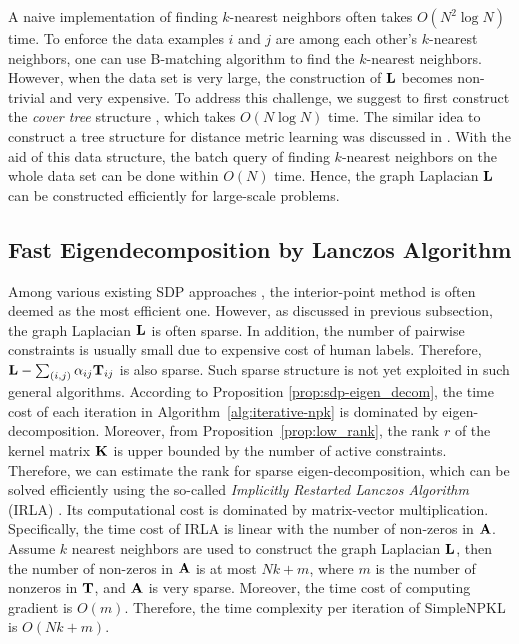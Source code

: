 A naive implementation of finding $k$-nearest neighbors often takes $O(N^2\log N)$
time. To enforce the data examples $i$ and $j$ are
among each other's $k$-nearest neighbors, one can use B-matching algorithm \cite{ecml/JebaraS06} to find the $k$-nearest neighbors. However, when the data set is very large, the construction of ${\bf L}$ becomes non-trivial and very expensive. To address this challenge, we suggest to first construct the {\em cover tree} structure \cite{icml/BeygelzimerKL06}, which takes $O(N\log N)$ time. The similar idea to construct a tree structure for distance metric learning was discussed in \cite{icml/weinberger08}. With the aid of this data structure, the batch query of finding $k$-nearest neighbors on the whole data set can be done within $O(N)$ time. Hence, the graph Laplacian ${\bf L}$ can be constructed efficiently for large-scale problems.

\subsection{Fast Eigendecomposition by Lanczos Algorithm} \label{sec:lanczos}

Among various existing SDP approaches \cite{Boyd}, the interior-point method is often deemed as the most efficient one. However, as discussed in previous subsection, the graph Laplacian ${\bf L}$ is often sparse. In addition,  the number of pairwise constraints is usually small due to expensive cost of human labels. Therefore, ${\bf L} - \sum_{(i,j)}{\alpha}_{ij}{\bf T}_{ij}$ is also sparse. Such sparse structure is not yet exploited in such general algorithms. According to Proposition \ref{prop:sdp-eigen_decom}, the time cost of each iteration in Algorithm~\ref{alg:iterative-npk} is dominated by eigen-decomposition. Moreover, from Proposition~\ref{prop:low_rank}, the rank $r$ of the kernel matrix ${\bf K}$ is upper bounded by the number of active constraints. Therefore, we can estimate the rank for sparse eigen-decomposition, which can be solved efficiently using the
so-called \emph{Implicitly Restarted Lanczos Algorithm} (IRLA) \cite{tr/LehoucqSY98}. Its computational cost is dominated by matrix-vector multiplication. Specifically, the time cost of  IRLA is linear with the number of non-zeros in ${\bf A}$. Assume $k$ nearest neighbors are used to construct the graph Laplacian ${\bf L}$, then the number of non-zeros in ${\bf A}$ is at most $Nk+m$, where $m$ is the number of nonzeros in ${\bf T}$, and   ${\bf A}$ is very sparse. Moreover, the time cost of computing gradient is $O(m)$. Therefore, the time complexity per iteration of  SimpleNPKL is  $O(Nk + m)$.

